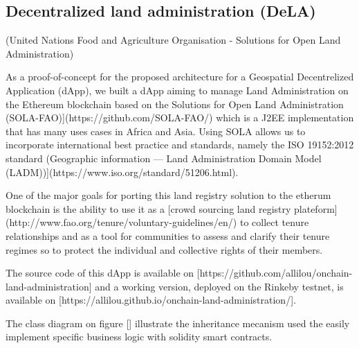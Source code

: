 \documentclass{isprs} %
\begin{document}
\subsection{Decentralized land administration (DeLA)}\label{sec:Decentralized land administration (DeLA)}

(United Nations Food and Agriculture Organisation - Solutions for Open Land Administration)

As a proof-of-concept for the proposed architecture for a Geospatial Decentrelized Application (dApp), we built a dApp aiming to manage Land Administration on the Ethereum blockchain based on the Solutions for Open Land Administration (SOLA-FAO)](https://github.com/SOLA-FAO/) which is a J2EE implementation that has many uses cases in Africa and Asia. Using SOLA allows us to incorporate international best practice and standards, namely the ISO 19152:2012 standard (Geographic information — Land Administration Domain Model (LADM))](https://www.iso.org/standard/51206.html).

One of the major goals for porting this land registry solution to the etherum blockchain is the ability to use it as a [crowd sourcing land registry plateform](http://www.fao.org/tenure/voluntary-guidelines/en/) to collect tenure relationships and as a tool for communities to assess and clarify their tenure regimes so to protect the individual and collective rights of their members. 

The source code of this dApp is available on [https://github.com/allilou/onchain-land-administration] and a working version, deployed on the Rinkeby testnet, is available on [https://allilou.github.io/onchain-land-administration/].

The class diagram on figure [] illustrate the inheritance mecanism used the easily implement specific business logic with solidity smart contracts.
\end{document}
